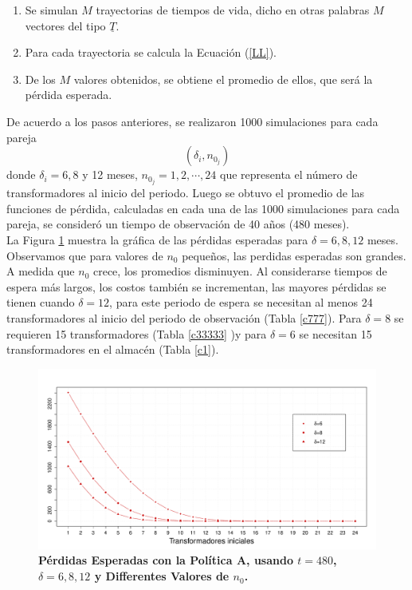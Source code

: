 \begin{enumerate}
\item Se simulan $M$ trayectorias de tiempos de vida, dicho en otras palabras $M$ vectores del tipo $\underline{T}$.
\item Para cada trayectoria se calcula la Ecuaci\'on (\ref{LL}).
\item De los $M$ valores obtenidos,  se obtiene el promedio de ellos, que ser\'a la p\'erdida esperada.
\end{enumerate}

\noindent De acuerdo a los pasos anteriores, se realizaron 1000 simulaciones para cada pareja $$(\delta_i,n_{0_j})$$ donde $\delta_i=6, 8$ y 12 meses, $n_{0_j}=1,2,\cdots, 24$ que representa el n\'umero de transformadores al inicio del periodo. Luego se obtuvo el promedio de las funciones de p\'erdida, calculadas en cada una de las 1000 simulaciones para cada pareja, se consider\'o un tiempo de observaci\'on de 40 a\~nos (480 meses).\\[0.1cm]

\noindent La Figura \ref{d6s} muestra la gr\'afica de las p\'erdidas esperadas para $\delta=6,8,12$ meses.  Observamos que para valores de $n_0$ peque\~nos, 
las perdidas esperadas son grandes. A medida que $n_0$ crece, los promedios disminuyen. Al considerarse tiempos de espera m\'as largos, los costos tambi\'en se incrementan, las mayores p\'erdidas se tienen cuando $\delta=12$, para este periodo de espera se necesitan al menos 24 transformadores al inicio del periodo de observaci\'on (Tabla \ref{c777}). Para $\delta=8$ se requieren 15 transformadores (Tabla  \ref{c33333} )y para $\delta=6$ se necesitan 15 transformadores en el almac\'en (Tabla \ref{c1}).



\begin{figure}[h!]
\begin{center}
\includegraphics[scale=0.35]{poA.pdf}
\end{center}
\vspace{-1 cm} \caption{\bf P\'erdidas Esperadas con la Pol\'itica A, usando $t=480$, $\delta=6,8,12$ y Differentes Valores de $n_0$.}\label{d6s}
\end{figure}


